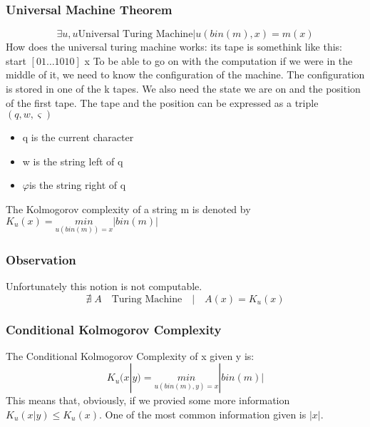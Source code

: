     \subsubsection{Universal Machine Theorem}
    $$\exists u, u \text{Universal Turing Machine} | u(bin(m), x) = m(x)$$
    How does the universal turing machine works:
    its tape is somethink like this: start $ \left[ 01\ldots 1010 \right] $ x
    To be able to go on with the computation if we were in the middle of it, we need to know the configuration of the machine.
    The configuration is stored in one of the k tapes. We also need the state we are on and the position of the first tape.
    The tape and the position can be expressed as a triple $(q, w, \varsigma)$
    \begin{itemize}
        \item q is the current character
        \item w is the string left of q
        \item $\varphi $is the string right of q
    \end{itemize}
    The Kolmogorov complexity of a string m is denoted by $K_u(x) = \underset{u(bin(m))=x}{min}|bin(m)|$
    \subsubsection{Observation}
    Unfortunately this notion is not computable. $$
    \nexists\; A\quad \text{Turing Machine} \quad|\quad A(x) = K_u(x)$$
    \subsubsection{Conditional Kolmogorov Complexity}
    The Conditional Kolmogorov Complexity of x given y is:
    $$ K_u(x|y) = \underset{u(bin(m),y)=x}{min} |bin(m)| $$
    This means that, obviously, if we provied some more information $K_u(x|y) \leq K_u(x)$. One of the most common information given is $|x|$.\\
    
